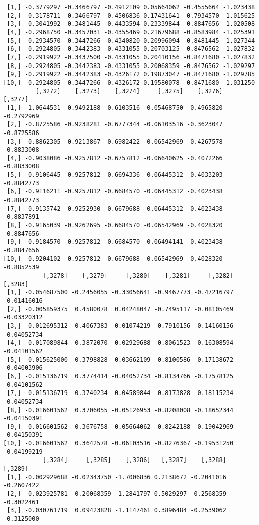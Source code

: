 \documentclass[
  letterpaper,
  DIV=11,
  numbers=noendperiod]{scrreprt}
\begin{document}
\begin{verbatim}
 [1,] -0.3779297 -0.3466797 -0.4912109 0.05664062 -0.4555664 -1.023438
 [2,] -0.3178711 -0.3466797 -0.4506836 0.17431641 -0.7934570 -1.015625
 [3,] -0.3041992 -0.3481445 -0.4433594 0.23339844 -0.8847656 -1.020508
 [4,] -0.2968750 -0.3457031 -0.4355469 0.21679688 -0.8583984 -1.025391
 [5,] -0.2934570 -0.3447266 -0.4340820 0.20996094 -0.8481445 -1.027344
 [6,] -0.2924805 -0.3442383 -0.4331055 0.20703125 -0.8476562 -1.027832
 [7,] -0.2919922 -0.3437500 -0.4331055 0.20410156 -0.8471680 -1.027832
 [8,] -0.2924805 -0.3442383 -0.4331055 0.20068359 -0.8476562 -1.029297
 [9,] -0.2919922 -0.3442383 -0.4326172 0.19873047 -0.8471680 -1.029785
[10,] -0.2924805 -0.3447266 -0.4326172 0.19580078 -0.8471680 -1.031250
         [,3272]    [,3273]    [,3274]     [,3275]    [,3276]    [,3277]
 [1,] -1.0644531 -0.9492188 -0.6103516 -0.05468750 -0.4965820 -0.2792969
 [2,] -0.8725586 -0.9238281 -0.6777344 -0.06103516 -0.3623047 -0.8725586
 [3,] -0.8862305 -0.9213867 -0.6982422 -0.06542969 -0.4267578 -0.8833008
 [4,] -0.9038086 -0.9257812 -0.6757812 -0.06640625 -0.4072266 -0.8833008
 [5,] -0.9106445 -0.9257812 -0.6694336 -0.06445312 -0.4033203 -0.8842773
 [6,] -0.9116211 -0.9257812 -0.6684570 -0.06445312 -0.4023438 -0.8842773
 [7,] -0.9135742 -0.9252930 -0.6679688 -0.06445312 -0.4023438 -0.8837891
 [8,] -0.9165039 -0.9262695 -0.6684570 -0.06542969 -0.4028320 -0.8847656
 [9,] -0.9184570 -0.9257812 -0.6684570 -0.06494141 -0.4023438 -0.8847656
[10,] -0.9204102 -0.9257812 -0.6679688 -0.06542969 -0.4028320 -0.8852539
           [,3278]    [,3279]     [,3280]    [,3281]     [,3282]     [,3283]
 [1,] -0.054687500 -0.2456055 -0.33056641 -0.9467773 -0.47216797 -0.01416016
 [2,] -0.005859375  0.4580078  0.04248047 -0.7495117 -0.08105469 -0.03320312
 [3,] -0.012695312  0.4067383 -0.01074219 -0.7910156 -0.14160156 -0.04052734
 [4,] -0.017089844  0.3872070 -0.02929688 -0.8061523 -0.16308594 -0.04101562
 [5,] -0.015625000  0.3798828 -0.03662109 -0.8100586 -0.17138672 -0.04003906
 [6,] -0.015136719  0.3774414 -0.04052734 -0.8134766 -0.17578125 -0.04101562
 [7,] -0.015136719  0.3740234 -0.04589844 -0.8173828 -0.18115234 -0.04052734
 [8,] -0.016601562  0.3706055 -0.05126953 -0.8208008 -0.18652344 -0.04150391
 [9,] -0.016601562  0.3676758 -0.05664062 -0.8242188 -0.19042969 -0.04150391
[10,] -0.016601562  0.3642578 -0.06103516 -0.8276367 -0.19531250 -0.04199219
           [,3284]     [,3285]    [,3286]   [,3287]    [,3288]    [,3289]
 [1,] -0.002929688 -0.02343750 -1.7006836 0.2138672 -0.2041016 -0.2607422
 [2,] -0.023925781  0.20068359 -1.2841797 0.5029297 -0.2568359 -0.3022461
 [3,] -0.030761719  0.09423828 -1.1147461 0.3896484 -0.2539062 -0.3125000

\end{verbatim}
\end{document}

